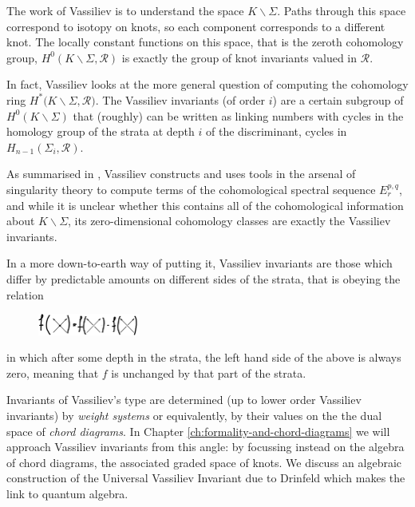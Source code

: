 The work of Vassiliev is to understand the space
\(K \smallsetminus \Sigma\).
Paths through this space correspond to isotopy on knots, so each component corresponds to a different knot. The locally constant functions on this space, that is the zeroth cohomology group,
\({H^{0}(K \smallsetminus \Sigma, \mathcal{R})}\)
is exactly the group of knot invariants valued in
\(\mathcal{R}\).

In fact, Vassiliev looks at the more general question of computing the cohomology ring
\({H^{\ast}(K \smallsetminus \Sigma, \mathcal{R}})\).
The Vassiliev invariants (of order \(i\)) are a certain subgroup of
\({H^{0}(K \smallsetminus \Sigma)}\)
that (roughly) can be written as linking numbers with cycles in the homology group of the strata at depth \(i\) of the discriminant, cycles in
\({H_{n - 1}(\Sigma_{i}, \mathcal{R})}\).

As summarised in \cite{introduction-to-vassiliev-invariants}, Vassiliev constructs and uses tools in the arsenal of singularity theory to compute terms of the cohomological spectral sequence \(E^{p, q}_{r}\), and while it is unclear whether this contains all of the cohomological information about \({K \smallsetminus \Sigma}\), its zero-dimensional cohomology classes are exactly the Vassiliev invariants.

In a more down-to-earth way of putting it, Vassiliev invariants are those which differ by predictable amounts on different sides of the strata, that is obeying the relation
\begin{figure}[H]
        \centering
        \includegraphics[width=0.3\textwidth]{graphics/vassiliev_relation.png}
\end{figure}
\noindent
in which after some depth in the strata, the left hand side of the above is always zero, meaning that \(f\) is unchanged by that part of the strata.

Invariants of Vassiliev's type are determined (up to lower order Vassiliev invariants) by \textit{weight systems} or equivalently, by their values on the the dual space of \textit{chord diagrams}. In Chapter \ref{ch:formality-and-chord-diagrams} we will approach Vassiliev invariants from this angle: by focussing instead on the algebra of chord diagrams, the associated graded space of knots. We discuss an algebraic construction of the Universal Vassiliev Invariant due to Drinfeld which makes the link to quantum algebra.

